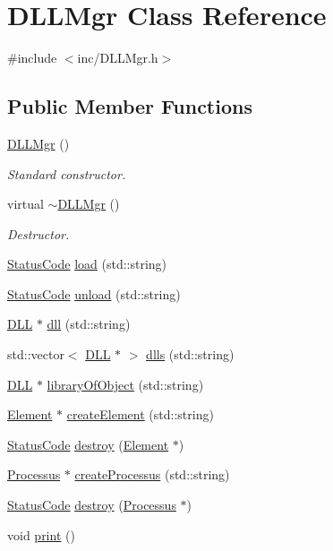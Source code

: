 \hypertarget{classDLLMgr}{
\section{DLLMgr Class Reference}
\label{classDLLMgr}
}


{\ttfamily \#include $<$inc/DLLMgr.h$>$}\subsection*{Public Member Functions}
\begin{DoxyCompactItemize}
\item 
\hyperlink{classDLLMgr_a3751927270f2acc954d9171e1f109876}{DLLMgr} ()
\begin{DoxyCompactList}\small\item\em Standard constructor. \item\end{DoxyCompactList}\item 
virtual \hyperlink{classDLLMgr_a80e79a573af874023318064ad9d32e74}{$\sim$DLLMgr} ()
\begin{DoxyCompactList}\small\item\em Destructor. \item\end{DoxyCompactList}\item 
\hyperlink{classStatusCode}{StatusCode} \hyperlink{classDLLMgr_a3c92bec62ace09dd00959c31bb2475d6}{load} (std::string)
\item 
\hyperlink{classStatusCode}{StatusCode} \hyperlink{classDLLMgr_a0e4b881509f638f94cb4d6612578157b}{unload} (std::string)
\item 
\hyperlink{classDLL}{DLL} $\ast$ \hyperlink{classDLLMgr_a0241372eb2e136f61e609a04426636bd}{dll} (std::string)
\item 
std::vector$<$ \hyperlink{classDLL}{DLL} $\ast$ $>$ \hyperlink{classDLLMgr_a40a2b326bd4f01e58b4afa78a3773898}{dlls} (std::string)
\item 
\hyperlink{classDLL}{DLL} $\ast$ \hyperlink{classDLLMgr_a7e8c992899b7357158aef047a2f15c51}{libraryOfObject} (std::string)
\item 
\hyperlink{classElement}{Element} $\ast$ \hyperlink{classDLLMgr_a8cc61eaf98a6aa3cb99fee7226477053}{createElement} (std::string)
\item 
\hyperlink{classStatusCode}{StatusCode} \hyperlink{classDLLMgr_abc9c97bab16c8f261626ed401d67c8c8}{destroy} (\hyperlink{classElement}{Element} $\ast$)
\item 
\hyperlink{classProcessus}{Processus} $\ast$ \hyperlink{classDLLMgr_a04161fedb24bb6ae8469848d97804c39}{createProcessus} (std::string)
\item 
\hyperlink{classStatusCode}{StatusCode} \hyperlink{classDLLMgr_a8f0923cc39c9f73d272f38bcbcf7ca18}{destroy} (\hyperlink{classProcessus}{Processus} $\ast$)
\item 
void \hyperlink{classDLLMgr_a223c039ca2d098fd825d52b22a9feeb4}{print} ()
\end{DoxyCompactItemize}
